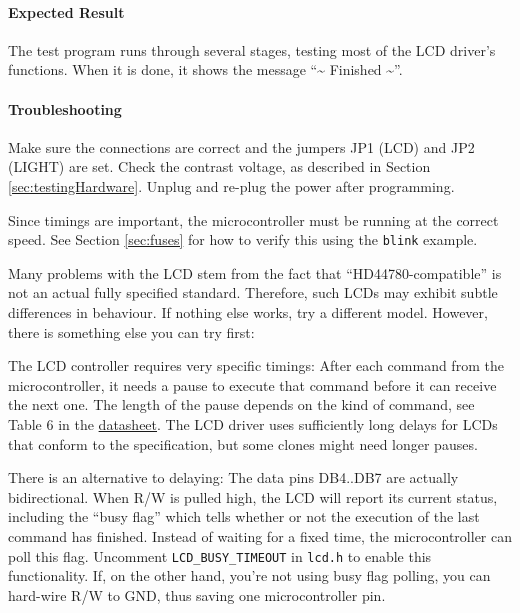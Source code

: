 \documentclass{article}
\newcommand{\file}[1]{\texttt{#1}}
\begin{document}
\paragraph{Expected Result}
The test program runs through several stages, testing most of the LCD driver's functions. When it is done, it shows the message ``\~{} Finished \~{}''. 

\paragraph{Troubleshooting}
Make sure the connections are correct and the jumpers JP1 (LCD) and JP2 (LIGHT) are set. Check the contrast voltage, as described in Section \ref{sec:testingHardware}. Unplug and re-plug the power after programming. 

Since timings are important, the microcontroller must be running at the correct speed. See Section \ref{sec:fuses} for how to verify this using the \texttt{blink} example. 

Many problems with the LCD stem from the fact that ``HD44780-compatible'' is not an actual fully specified standard. Therefore, such LCDs may exhibit subtle differences in behaviour. If nothing else works, try a different model. However, there is something else you can try first:

The LCD controller requires very specific timings: After each command from the microcontroller, it needs a pause to execute that command before it can receive the next one. The length of the pause depends on the kind of command, see Table 6 in the \href{https://cdn-shop.adafruit.com/datasheets/HD44780.pdf}{datasheet}. The LCD driver uses sufficiently long delays for LCDs that conform to the specification, but some clones might need longer pauses. 

There is an alternative to delaying: The data pins DB4..DB7 are actually bidirectional. When R/W is pulled high, the LCD will report its current status, including the ``busy flag'' which tells whether or not the execution of the last command has finished. Instead of waiting for a fixed time, the microcontroller can poll this flag. Uncomment \lstinline[language=C]{LCD_BUSY_TIMEOUT} in \file{lcd.h} to enable this functionality. 
If, on the other hand, you're not using busy flag polling, you can hard-wire R/W to GND, thus saving one microcontroller pin. 
\end{document}
